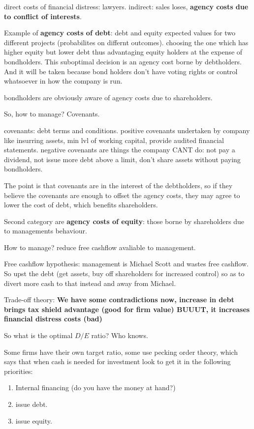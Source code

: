 \documentclass{article}
\begin{document}
direct costs of financial distress: lawyers. indirect: sales loses, \textbf{agency costs due to conflict of interests}. 

Example of \textbf{agency costs of debt}: debt and equity expected values for two different projects (probabilites on differnt outcomes). choosing the one which has higher equity but lower debt thus advantaging equity holders at the expense of bondholders. This suboptimal decision is an agency cost borne by debtholders. And it will be taken because bond holders don't have voting rights or control whatsoever in how the company is run. 

bondholders are obviously aware of agency costs due to shareholders. 

So, how to manage? Covenants.

covenants: debt terms and conditions.
positive covenants undertaken by company like insurring assets, min lvl of working capital, provide audited financial statements.
negative covenants are things the company CANT do: not pay a dividend, not issue more debt above a limit, don't share assets without paying bondholders. 

The point is that covenants are in the interest of the debtholders, so if they believe the covenants are enough to offset the agency costs, they may agree to lower the cost of debt, which benefits shareholders.

Second category are \textbf{agency costs of equity}: those borne by shareholders due to managements behaviour. 

How to manage? reduce free cashflow avaliable to management.

Free cashflow hypothesis: management is Michael Scott and wastes free cashflow. So upst the debt (get assets, buy off shareholders for increased control) so  as to divert more cash to that instead and away from Michael. 

Trade-off theory:
\textbf{We have some contradictions now, increase in debt brings tax shield advantage (good for firm value) BUUUT, it increases financial distress costs (bad)}

So what is the optimal $D/E$ ratio? Who knows. 

Some firms have their own target ratio, some use pecking order theory, which says that when cash is needed for investment look to get it in the following priorities:
\begin{enumerate}
\item Internal financing (do you have the money at hand?)
\item issue debt.
\item issue equity.
\end{enumerate}
\end{document}
